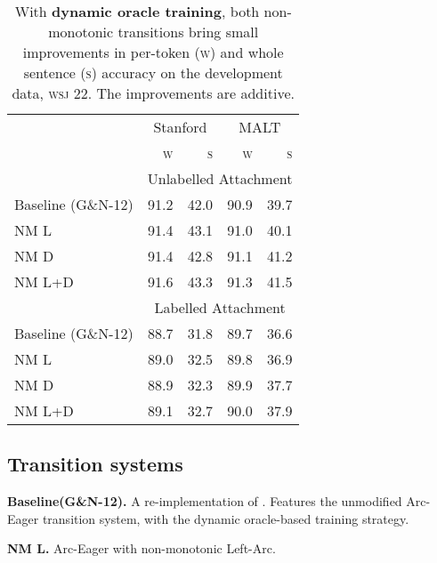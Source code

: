 \documentclass[11pt,letterpaper]{article}
\newcommand{\wsj}{\textsc{wsj}\xspace}
\begin{document}
\begin{table}[t]
    \small
    \centering
    \begin{tabular}{l|rrrr}
        \hline
        & \multicolumn{2}{c}{Stanford} & \multicolumn{2}{c}{MALT}  \\
        & \textsc{w}  & \textsc{s} & \textsc{w} & \textsc{s} \\
        \hline \hline
        & \multicolumn{4}{c}{Unlabelled Attachment} \\
        \hline
        Baseline (G\&N-12) & 91.2 & 42.0 & 90.9 & 39.7 \\
        NM L & 91.4 & 43.1 & 91.0 & 40.1 \\
        NM D & 91.4 & 42.8 & 91.1 & 41.2 \\
        NM L+D & 91.6 & 43.3 & 91.3 & 41.5 \\
        \hline
        & \multicolumn{4}{c}{Labelled Attachment} \\
        \hline
        Baseline (G\&N-12)& 88.7 & 31.8 & 89.7 & 36.6 \\
        NM L & 89.0 & 32.5 & 89.8 & 36.9 \\
        NM D & 88.9 & 32.3 & 89.9 & 37.7 \\
        NM L+D & 89.1 & 32.7 & 90.0 & 37.9 \\
        \hline
    \end{tabular}
    \caption{\small
        With \textbf{dynamic oracle training}, both non-monotonic transitions
        bring small improvements in per-token (\textsc{w}) and whole sentence (\textsc{s})
        accuracy on the development data, \wsj 22. The improvements are
        additive.
        \label{tab:goldberg}}
\end{table}


\subsection{Transition systems}

\textbf{Baseline(G\&N-12).}
A re-implementation of \citep{goldberg:12}. Features the unmodified Arc-Eager transition
system, with the dynamic oracle-based training strategy.

\noindent\textbf{NM L.} Arc-Eager with non-monotonic Left-Arc.
\end{document}
